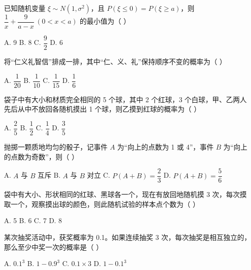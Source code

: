 \documentclass[11pt, a4paper]{article}
\begin{document}
\begin{baitap}[3]
已知随机变量 $\xi\sim N(1,\sigma^2)$，且 $P(\xi\le 0)=P(\xi\ge a)$，则 $\dfrac{1}{x}+\dfrac{9}{a-x}\ (0<x<a)$ 的最小值为（ ）
\par\vspace{3pt}
\noindent A. 9 \quad B. 8 \quad C. $\dfrac{9}{2}$ \quad D. 6
\end{baitap}

\begin{baitap}[4]
将“仁义礼智信”排成一排，其中“仁、义、礼”保持顺序不变的概率为（ ）
\par\vspace{3pt}
\noindent A. $\dfrac{1}{20}$ \quad B. $\dfrac{1}{10}$ \quad C. $\dfrac{1}{15}$ \quad D. $\dfrac{1}{6}$
\end{baitap}

\begin{baitap}[5]
袋子中有大小和材质完全相同的 5 个球，其中 2 个红球，3 个白球，甲、乙两人先后从中不放回各随机摸出 1 个球，则乙摸到红球的概率为（ ）
\par\vspace{3pt}
\noindent A. $\dfrac{2}{5}$ \quad B. $\dfrac{1}{2}$ \quad C. $\dfrac{1}{4}$ \quad D. $\dfrac{3}{5}$
\end{baitap}

\begin{baitap}[6]
抛掷一颗质地均匀的骰子，记事件 $A$ 为“向上的点数为 1 或 4”，事件 $B$ 为“向上的点数为奇数”，则（ ）
\par\vspace{3pt}
\noindent A. $A$ 与 $B$ 互斥 \quad B. $A$ 与 $B$ 对立 \quad C. $P(A+B)=\dfrac{2}{3}$ \quad D. $P(A+B)=\dfrac{5}{6}$
\end{baitap}

\begin{baitap}[7]
袋中有大小、形状相同的红球、黑球各一个，现在有放回地随机摸 3 次，每次摸取一个，观察摸出球的颜色，则此随机试验的样本点个数为（ ）
\par\vspace{3pt}
\noindent A. 5 \quad B. 6 \quad C. 7 \quad D. 8
\end{baitap}

\begin{baitap}[8]
某次抽奖活动中，获奖概率为 0.1。如果连续抽奖 3 次，每次抽奖是相互独立的，那么至少中奖一次的概率是（ ）
\par\vspace{3pt}
\noindent A. $0.1^3$ \quad B. $1-0.9^3$ \quad C. $0.1\times 3$ \quad D. $1-0.1^3$
\end{baitap}
\end{document}
